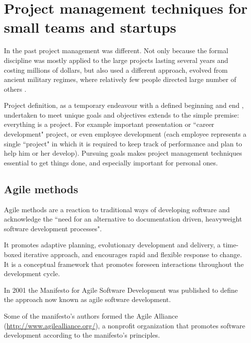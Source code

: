 \chapter{Project management techniques for small teams and startups}

In the past project management was different. Not only because the formal discipline was mostly applied to the large projects lasting several years and costing millions of dollars, but also used a different approach, evolved from ancient military regimes, where relatively few people directed large number of others \cite{brandon}.

Project definition, as a temporary endeavour with a defined beginning and end \cite{chatfield}, undertaken to meet unique goals and objectives \cite{nokes} extends to the simple premise: everything is a project. For example important presentation or ``career development" project, or even  employee development (each employee represents a single ``project" in which it is required to keep track of performance and plan to help him or her develop). Pursuing goals makes project management techniques essential to get things done, and especially important for personal ones.

% 

\section{Agile methods}

Agile methods are a reaction to traditional ways of developing software and acknowledge the ``need for an alternative to documentation driven, heavyweight software development processes".

It promotes adaptive planning, evolutionary development and delivery, a time-boxed iterative approach, and encourages rapid and flexible response to change. It is a conceptual framework that promotes foreseen interactions throughout the development cycle.

In 2001 the Manifesto for Agile Software Development \cite{agile-manifesto} was published to define the approach now known as agile software development. 

Some of the manifesto's authors formed the Agile Alliance (\url{http://www.agilealliance.org/}), a nonprofit organization that promotes software development according to the manifesto's principles.

